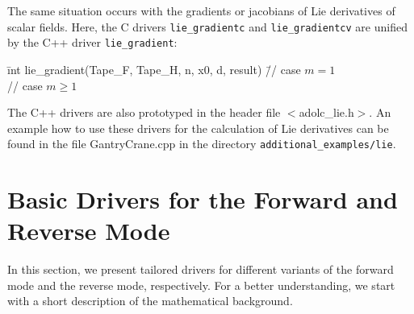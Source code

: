 \documentclass[11pt,twoside]{article}
\begin{document}
The same situation occurs with the gradients or jacobians of Lie derivatives of scalar fields. Here, the C drivers {\verb=lie_gradientc=} and {\verb=lie_gradientcv=} are unified by the C++ driver {\verb=lie_gradient=}:

\begin{tabbing}
\hspace{0.5in}\={\sf int lie\_gradient(Tape\_F, Tape\_H, n, x0, d, result)} \hspace{0.35in}\= // case $m=1$\\
 \> // case $m\geq1$
\end{tabbing} 

The C++ drivers are also prototyped in the header file {\sf $<$adolc\_lie.h$>$}. An example how to use these drivers for the calculation of Lie derivatives can be found in the file {\sf GantryCrane.cpp} in the directory {\verb=additional_examples/lie=}.

%
%
\section{Basic Drivers for the Forward and Reverse Mode}
\label{forw_rev_ad}
%
In this section, we present tailored drivers for different
variants of the forward mode and the reverse mode, respectively.
For a better understanding, we start with a short 
description of the mathematical background.
\end{document}
